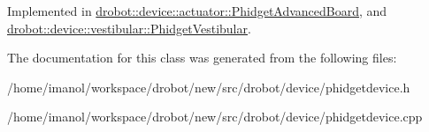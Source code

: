 Implemented in \hyperlink{classdrobot_1_1device_1_1actuator_1_1PhidgetAdvancedBoard_a67afbf98c18b80281226259f93fdb742}{drobot\-::device\-::actuator\-::\-Phidget\-Advanced\-Board}, and \hyperlink{classdrobot_1_1device_1_1vestibular_1_1PhidgetVestibular_a8292d6ebbc1910eca84081cf76bf3afe}{drobot\-::device\-::vestibular\-::\-Phidget\-Vestibular}.



The documentation for this class was generated from the following files\-:\begin{DoxyCompactItemize}
\item 
/home/imanol/workspace/drobot/new/src/drobot/device/phidgetdevice.\-h\item 
/home/imanol/workspace/drobot/new/src/drobot/device/phidgetdevice.\-cpp\end{DoxyCompactItemize}
